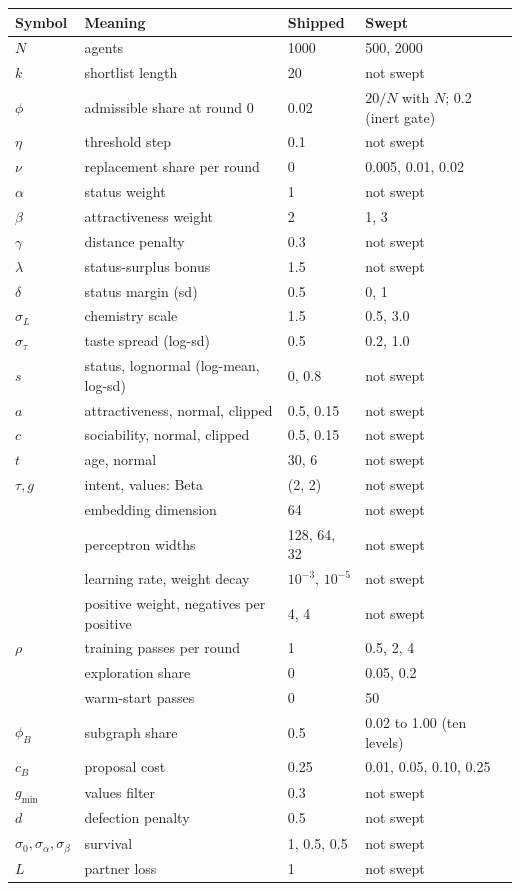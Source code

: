 \small
\begin{tabular}{llll}
\hline
Symbol & Meaning & Shipped & Swept \\
\hline
$N$ & agents & 1000 & 500, 2000 \\
$k$ & shortlist length & 20 & not swept \\
$\phi$ & admissible share at round 0 & 0.02 & $20/N$ with $N$; 0.2 (inert gate) \\
$\eta$ & threshold step & 0.1 & not swept \\
$\nu$ & replacement share per round & 0 & 0.005, 0.01, 0.02 \\
\hline
$\alpha$ & status weight & 1 & not swept \\
$\beta$ & attractiveness weight & 2 & 1, 3 \\
$\gamma$ & distance penalty & 0.3 & not swept \\
$\lambda$ & status-surplus bonus & 1.5 & not swept \\
$\delta$ & status margin (sd) & 0.5 & 0, 1 \\
$\sigma_L$ & chemistry scale & 1.5 & 0.5, 3.0 \\
$\sigma_\tau$ & taste spread (log-sd) & 0.5 & 0.2, 1.0 \\
\hline
$s$ & status, lognormal (log-mean, log-sd) & 0, 0.8 & not swept \\
$a$ & attractiveness, normal, clipped & 0.5, 0.15 & not swept \\
$c$ & sociability, normal, clipped & 0.5, 0.15 & not swept \\
$t$ & age, normal & 30, 6 & not swept \\
$\tau, g$ & intent, values: Beta & (2, 2) & not swept \\
\hline
 & embedding dimension & 64 & not swept \\
 & perceptron widths & 128, 64, 32 & not swept \\
 & learning rate, weight decay & $10^{-3}$, $10^{-5}$ & not swept \\
 & positive weight, negatives per positive & 4, 4 & not swept \\
$\rho$ & training passes per round & 1 & 0.5, 2, 4 \\
 & exploration share & 0 & 0.05, 0.2 \\
 & warm-start passes & 0 & 50 \\
\hline
$\phi_B$ & subgraph share & 0.5 & 0.02 to 1.00 (ten levels) \\
$c_B$ & proposal cost & 0.25 & 0.01, 0.05, 0.10, 0.25 \\
$g_{\min}$ & values filter & 0.3 & not swept \\
$d$ & defection penalty & 0.5 & not swept \\
$\sigma_0, \sigma_\alpha, \sigma_\beta$ & survival & 1, 0.5, 0.5 & not swept \\
$L$ & partner loss & 1 & not swept \\
\hline
\end{tabular}
